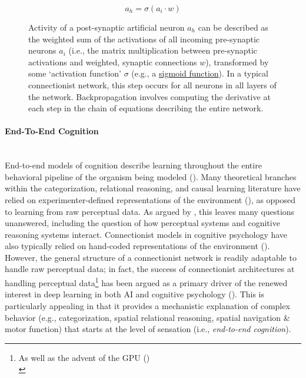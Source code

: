 \documentclass[12pt]{article}
\let\oldcite=\cite
\let\oldtextcite=\textcite
\renewcommand{\cite}[1]{\textcolor[rgb]{0, .121, .388}{\oldcite{#1}}}
\renewcommand{\textcite}[1]{\textcolor[rgb]{0, .121, .388}{\oldtextcite{#1}}}
\begin{document}
\begin{figure}
    $$ a_h = \sigma(a_i \cdot w) $$
    \caption{Activity of a post-synaptic artificial neuron \(a_h\) can be described as the weighted sum of the activations of all incoming pre-synaptic neurons \(a_i\) (i.e., the matrix multiplication between pre-synaptic activations and weighted, synaptic connections \(w\)), transformed by some `activation function' \(\sigma\) (e.g., a \href{https://en.wikipedia.org/wiki/Sigmoid_function}{sigmoid function}). In a typical connectionist network, this step occurs for all neurons in all layers of the network. Backpropagation involves computing the derivative at each step in the chain of equations describing the entire network.}
    \label{fig:activationFormula}
\end{figure}


\paragraph{End-To-End Cognition}\mbox{} \\

End-to-end models of cognition describe learning throughout the entire behavioral pipeline of the organism being modeled (\cite{glasmachers2017limits}). Many theoretical branches within the categorization, relational reasoning, and causal learning literature have relied on experimenter-defined representations of the environment (\cite{nosofsky1994comparing,anderson1991adaptive,falkenhainer1989structure,hummel1996lisa,danks2014unifying}), as opposed to learning from raw perceptual data. As argued by \textcite{chalmers1992high}, this leaves many questions unanswered, including the question of how perceptual systems and cognitive reasoning systems interact. Connectionist models in cognitive psychology have also typically relied on hand-coded representations of the environment (\cite{rogers2004semantic,gluck1988conditioning,kurtz2007divergent}). However, the general structure of a connectionist network is readily adaptable to handle raw perceptual data; in fact, the success of connectionist architectures at handling perceptual data\footnote{As well as the advent of the GPU (\cite{schmidhuber2015deep}) \\} has been argued as a primary driver of the renewed interest in deep learning in both AI and cognitive psychology (\cite{lecun2015deep,schmidhuber2015deep}). This is particularly appealing in that it provides a mechanistic explanation of complex behavior (e.g., categorization, spatial relational reasoning, spatial navigation \& motor function) that starts at the level of sensation (i.e., \emph{end-to-end cognition}). 
\end{document}

